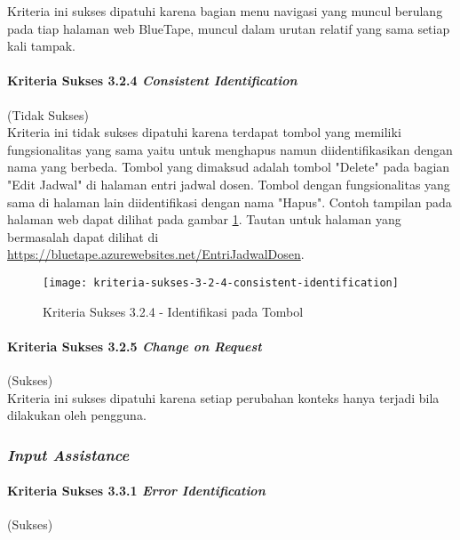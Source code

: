 Kriteria ini sukses dipatuhi karena bagian menu navigasi yang muncul berulang pada tiap halaman web BlueTape, muncul dalam urutan relatif yang sama setiap kali tampak.

\paragraph{Kriteria Sukses 3.2.4 \textit{Consistent Identification}}
\label{par:kepatuhan_bluetape_kriteria_sukses_3.2.4}
(Tidak Sukses)\\

Kriteria ini tidak sukses dipatuhi karena terdapat tombol yang memiliki fungsionalitas yang sama yaitu untuk menghapus namun diidentifikasikan dengan nama yang berbeda. Tombol yang dimaksud adalah tombol "Delete" pada bagian "Edit Jadwal" di halaman entri jadwal dosen. Tombol dengan fungsionalitas yang sama di halaman lain diidentifikasi dengan nama "Hapus". Contoh tampilan pada halaman web dapat dilihat pada gambar \ref{fig:3.2.4_consistent_identification}. Tautan untuk halaman yang bermasalah dapat dilihat di \url{https://bluetape.azurewebsites.net/EntriJadwalDosen}.

\begin{figure}[H]
    \centering  
    \texttt{[image: kriteria-sukses-3-2-4-consistent-identification]}  
    \caption[Kriteria Sukses 3.2.4 - Identifikasi pada Tombol]{Kriteria Sukses 3.2.4 - Identifikasi pada Tombol}
    \label{fig:3.2.4_consistent_identification}  
\end{figure}

\paragraph{Kriteria Sukses 3.2.5 \textit{Change on Request}}
\label{par:kepatuhan_bluetape_kriteria_sukses_3.2.5}
(Sukses)\\

Kriteria ini sukses dipatuhi karena setiap perubahan konteks hanya terjadi bila dilakukan oleh pengguna.

\subsubsection{\textit{Input Assistance}}
\label{subsubsec:kepatuhan_bluetape_input_assistance}

\paragraph{Kriteria Sukses 3.3.1 \textit{Error Identification}}
\label{par:kepatuhan_bluetape_kriteria_sukses_3.3.1}
(Sukses)\\

